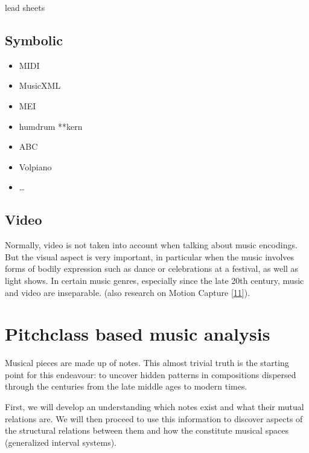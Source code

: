 \documentclass[letterpaper,10pt,english]{sphinxmanual}
\begin{document}
\sphinxAtStartPar
lead sheets


\section{Symbolic}
\label{\detokenize{encodings:symbolic}}\begin{itemize}
\item {} 
\sphinxAtStartPar
MIDI

\item {} 
\sphinxAtStartPar
MusicXML

\item {} 
\sphinxAtStartPar
MEI

\item {} 
\sphinxAtStartPar
humdrum **kern

\item {} 
\sphinxAtStartPar
ABC

\item {} 
\sphinxAtStartPar
Volpiano

\item {} 
\sphinxAtStartPar
…

\end{itemize}


\section{Video}
\label{\detokenize{encodings:video}}
\sphinxAtStartPar
Normally, video is not taken into account when talking about music encodings.
But the visual aspect is very important, in particular when the music involves forms of
bodily expression such as dance or celebrations at a festival, as well as light shows.
In certain music genres, especially since the late 20th century, music and video
are inseparable.  (also research on Motion Capture {[}\hyperlink{cite.8_bibliography:id13}{11}{]}).


\chapter{Pitch\sphinxhyphen{}class based music analysis}
\label{\detokenize{5_notes:pitch-class-based-music-analysis}}\label{\detokenize{5_notes::doc}}
\sphinxAtStartPar
Musical pieces are made up of notes. This almost trivial truth is the
starting point for this endeavour: to uncover hidden patterns in
compositions dispersed through the centuries from the late middle ages
to modern times.

\sphinxAtStartPar
First, we will develop an understanding which notes exist and what their
mutual relations are. We will then proceed to use this information to
discover aspects of the structural relations between them and how the
constitute musical spaces (generalized interval systems).
\end{document}
